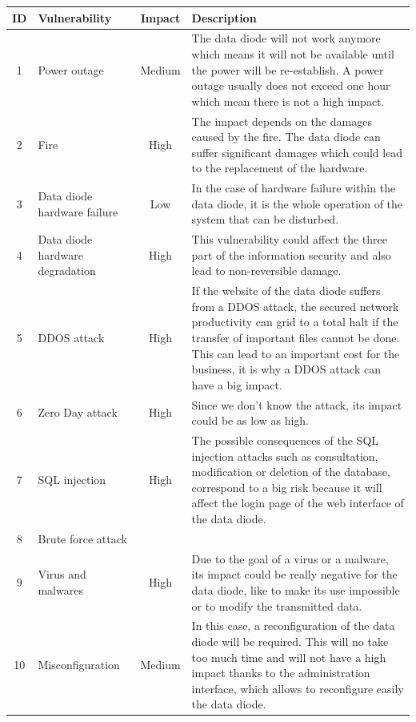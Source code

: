 \documentclass[a4paper,10pt]{article}
\begin{document}
\begin{longtable}{|c|p{2.5cm}|c|p{10cm}|}
\hline
\textbf{ID}& \textbf{Vulnerability} &\textbf{Impact} & \textbf{Description}                 \\
\hline
1 & Power outage & Medium  &  The data diode will not work anymore which means it will not be available until the power will be re-establish. A power outage usually does not exceed one hour which mean there is not a high impact. \\
\hline
2 & Fire & High  &  The impact depends on the damages caused by the fire. The data diode can suffer significant damages which could lead to the replacement of the hardware.\\
\hline
3 & Data diode hardware failure  & Low & In the case of hardware failure within the data diode, it is the whole operation of the system that can be disturbed.\\
\hline
4 & Data diode hardware degradation & High & This vulnerability could affect the three part of the information security and also lead to non-reversible damage. \\
\hline
5 & DDOS attack & High & If the website of the data diode suffers from a DDOS attack, the secured network productivity can grid to a total halt if the transfer of important files cannot be done. This can lead to an important cost for the business, it is why a DDOS attack can have a big impact.\\
\hline
6 & Zero Day attack & High & Since we don't know the attack, its impact could be as low as high.\\
\hline
7 &  SQL injection & High & The possible consequences of the SQL injection attacks such as consultation, modification or deletion of the database, correspond to a big risk because it will affect the login page of the web interface of the data diode. \\
\hline
8 & Brute force attack & & \\
\hline
9 & Virus and malwares & High & Due to the goal of a virus or a malware, its impact could be really negative for the data diode, like to make its use impossible or to modify the transmitted data. \\
\hline
10 & Misconfiguration & Medium & In this case, a reconfiguration of the data diode will be required. This will no take too much time and will not have a high impact thanks to the administration interface, which allows to reconfigure easily the data diode. \\

\end{longtable}
\end{document}
